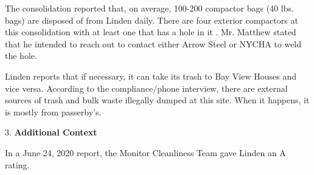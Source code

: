 The consolidation reported that, on average, 100-200 compactor bags (40 lbs. bags) are disposed of from Linden daily. There are four exterior compactors at this consolidation with at least one that has a hole in it . Mr. Matthew stated that he intended to reach out to contact either Arrow Steel or NYCHA to weld the hole.

Linden reports that if necessary, it can take its trash to Bay View Houses and vice versa. According to the compliance/phone interview, there are external sources of trash and bulk waste illegally dumped at this site. When it happens, it is mostly from passerby's. 

3. \textbf{Additional Context} 

In a June 24, 2020 report, the Monitor Cleanliness Team gave Linden an A rating. 